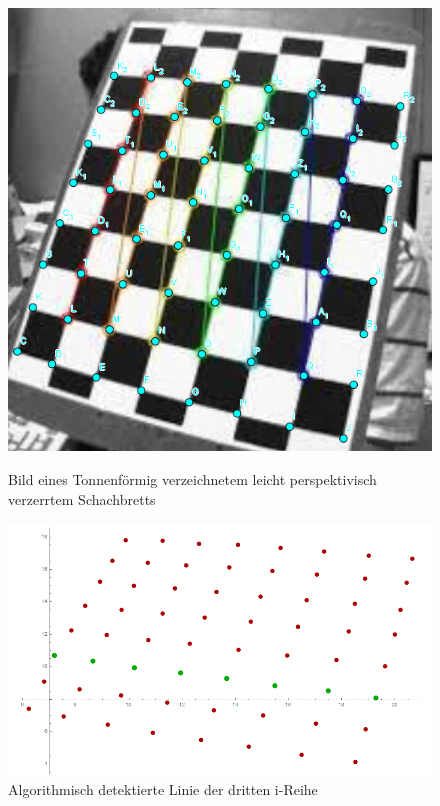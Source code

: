 \begin{figure}[!htb]
	\includegraphics[width=\linewidth]{images/TonnePers.png}
	\caption{Bild eines Tonnenförmig verzeichnetem leicht perspektivisch verzerrtem Schachbretts}
	\label{fig:awesome_image1}
	\endminipage\hfill
	\includegraphics[width=\linewidth]{images/AlgTonnePers.png}
	\caption{Algorithmisch detektierte Linie der dritten i-Reihe}
	\label{fig:awesome_image2}
	\endminipage\hfill
\end{figure}

